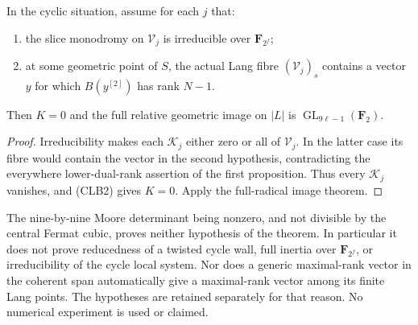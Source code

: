 \begin{theorem}
\label{thm:cyclic-Lang-block-test}
In the cyclic situation, assume for each \(j\) that:
\begin{enumerate}
\item the slice monodromy on \(\mathcal V_j\) is irreducible
over \(\mathbf F_{2^f}\);
\item at some geometric point of \(S\), the actual Lang fibre
\((\mathcal V_j)_s\) contains a vector \(y\) for which
\(B(y^{[2]})\) has rank \(N-1\).
\end{enumerate}
Then \(K=0\) and the full relative geometric image on
\(|L|\) is \(\operatorname{GL}_{9\ell-1}(\mathbf F_2)\).
\end{theorem}
\begin{proof}
Irreducibility makes each \(\mathcal K_j\) either zero or
all of \(\mathcal V_j\). In the latter case its fibre would
contain the vector in the second hypothesis, contradicting the
everywhere lower-dual-rank assertion of the first proposition.
Thus every \(\mathcal K_j\) vanishes, and (CLB2) gives
\(K=0\). Apply the full-radical image theorem.
\end{proof}

\begin{remark}
\label{rem:cyclic-Lang-block-test-scope}
The nine-by-nine Moore determinant being nonzero, and not divisible
by the central Fermat cubic, proves neither hypothesis of the
theorem. In particular it does not prove reducedness of a twisted
cycle wall, full inertia over \(\mathbf F_{2^f}\), or
irreducibility of the cycle local system. Nor does a generic
maximal-rank vector in the coherent span automatically give a
maximal-rank vector among its finite Lang points. The hypotheses
are retained separately for that reason. No numerical experiment
is used or claimed.
\end{remark}
